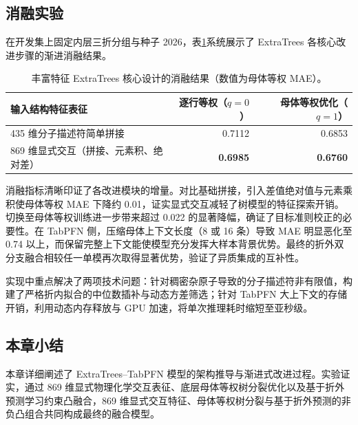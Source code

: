 \subsection{消融实验}

在开发集上固定内层三折分组与种子 2026，表\ref{tab:v2_tree_pilot}系统展示了 ExtraTrees 各核心改进步骤的渐进消融结果。

\begin{table}[htbp]
\centering
\small
\caption{丰富特征 ExtraTrees 核心设计的消融结果（数值为母体等权 MAE）。}
\label{tab:v2_tree_pilot}
\begin{tabular}{lrr}
\toprule
输入结构特征表征 & 逐行等权（$q=0$） & 母体等权优化（$q=1$） \\
\midrule
435 维分子描述符简单拼接 & 0.7112 & 0.6853 \\
869 维显式交互（拼接、元素积、绝对差） & \textbf{0.6985} & \textbf{0.6760} \\
\bottomrule
\end{tabular}
\end{table}

消融指标清晰印证了各改进模块的增量。对比基础拼接，引入差值绝对值与元素乘积使母体等权 MAE 下降约 0.01，证实显式交互减轻了树模型的特征探索开销。切换至母体等权训练进一步带来超过 0.022 的显著降幅，确证了目标准则校正的必要性。在 TabPFN 侧，压缩母体上下文长度（8 或 16 条）导致 MAE 明显恶化至 0.74 以上，而保留完整上下文能使模型充分发挥大样本背景优势。最终的折外双分支融合相较任一单模再次取得显著优势，验证了异质集成的互补性。

实现中重点解决了两项技术问题：针对稠密杂原子导致的分子描述符非有限值，构建了严格折内拟合的中位数插补与动态方差筛选；针对 TabPFN 大上下文的存储开销，利用动态内存释放与 GPU 加速，将单次推理耗时缩短至亚秒级。

\subsection{本章小结}

本章详细阐述了 ExtraTrees--TabPFN 模型的架构推导与渐进式改进过程。实验证实，通过 869 维显式物理化学交互表征、底层母体等权树分裂优化以及基于折外预测学习约束凸融合，869 维显式交互特征、母体等权树分裂与基于折外预测的非负凸组合共同构成最终的融合模型。